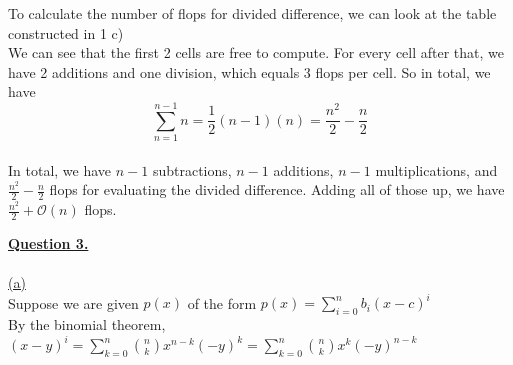 \documentclass[12pt]{article}
\begin{document}
To calculate the number of flops for divided difference, we can look at the table constructed in 1 c)\\
We can see that the first 2 cells are free to compute. For every cell after that, we have 2 additions and one division,
which equals 3 flops per cell. So in total, we have
$$
    \sum_{n=1}^{n-1} n = \frac{1}{2}(n-1) (n) = \frac{n^2}{2} - \frac{n}{2}
$$\\

In total, we have $n-1$ subtractions, $n-1$ additions, $n-1$ multiplications, and
$\frac{n^2}{2} - \frac{n}{2}$ flops for evaluating the divided difference. Adding all of those up, we have
$\frac{n^2}{2} + \mathcal{O}(n)$ flops.


\newpage
{{\LARGE \underline{\textbf{Question 3.}}}}\\
~\\\hyperlink{toc}{\hypertarget{3.1}{(a)}}\\
Suppose we are given $p(x)$ of the form $p(x) = \sum_{i=0}^{n}b_i(x-c)^i$\\
By the binomial theorem, $(x-y)^i = \sum_{k=0}^{n} \binom{n}{k} x^{n-k}(-y)^k = \sum_{k=0}^{n} \binom{n}{k} x^k(-y)^{n-k}$\\
\end{document}
